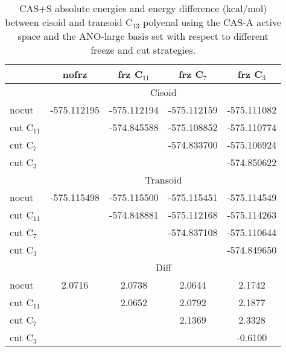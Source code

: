 \begin{center}
\begin{table}[!ht]
\footnotesize
\begin{center}
\begin{tabular}{lcccc}
\hline                                                      
        &    nofrz       &    frz C$_{11}$      &   frz C$_{7}$        &   frz C$_{3}$      \\
\hline                                                      
			&	\multicolumn{4}{c}{Cisoid} \\
nocut		&  -575.112195   &  -575.112194    	&  -575.112159   & -575.111082   \\
cut C$_{11}$&             	 &  -574.845588    	&  -575.108852   & -575.110774   \\
cut C$_{7}$	&             	 &                	&  -574.833700   & -575.106924   \\
cut C$_{3}$	&             	 &					&                & -574.850622  	\\
			&	\multicolumn{4}{c}{Transoid} \\
nocut		&	-575.115498  	&	-575.115500  	&	-575.115451  	& -575.114549   \\
cut C$_{11}$&	             	&	-574.848881  	&	-575.112168  	& -575.114263   \\
cut C$_{7}$	&					&					&	-574.837108  	& -575.110644   \\
cut C$_{3}$	&					&					&					& -574.849650  	\\
			&	\multicolumn{4}{c}{Diff} \\
nocut			& 2.0716    &	2.0738    	&	2.0644    	&	2.1742    \\
cut C$_{11}$	&			&  	2.0652     	&	2.0792    	&	2.1877    \\
cut C$_{7}$		&			&				&  	2.1369    	&	2.3328    \\
cut C$_{3}$		&			&				&				&  -0.6100    \\
\hline
\end{tabular}
\end{center}
\caption{\footnotesize CAS+S absolute energies and energy difference
(kcal/mol) between cisoid and transoid C$_{13}$ polyenal using the CAS-A
active space and the ANO-large basis set with respect to different freeze
and cut strategies.}
\label{tbl:C13-cis-trans-diff-ano-large}
\end{table}
\end{center}

